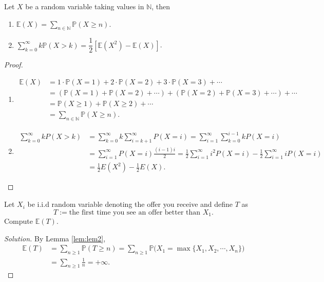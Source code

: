 \documentclass[11pt,singlecolumn, openany, citestyle=authoryear]{elegantbook}
\begin{document}
\begin{CJK}{UTF8}{gbsn}
\begin{lemma}\label{lem:lem2}
    Let $X$ be a random variable taking values in $\mathbb{N}$, then 
    \begin{enumerate}
    \item $\mathbb{E}(X)=\displaystyle \sum_{n\in\mathbb{N}}\mathbb{P}(X\geqslant n).$
    \item $\displaystyle \sum_{k=0}^\infty k\mathbb{P}(X>k)=\dfrac{1}{2}
    [\mathbb{E}(X^2)-\mathbb{E}(X)]$.
    \end{enumerate}
\end{lemma}
\begin{proof}
    \begin{enumerate}
    \item \begin{align*}
    \mathbb{E}(X) &= 1\cdot \mathbb{P}(X=1)+2\cdot \mathbb{P}(X=2)+
    3\cdot \mathbb{P}(X=3)+\cdots \\
    &= (\mathbb{P}(X=1)+\mathbb{P}(X=2)+\cdots)+(\mathbb{P}(X=2)+\mathbb{P}(X=3)+\cdots)
    +\cdots \\
    &= \mathbb{P}(X\geqslant 1)+\mathbb{P}(X\geqslant 2)+\cdots \\
    &= \sum_{n\in\mathbb{N}}\mathbb{P}(X\geqslant n).
    \end{align*}
    \item 
    \begin{align*}
    \sum_{k=0}^{\infty} k P(X>k) & =\sum_{k=0}^{\infty} k \sum_{i=k+1}^{\infty} P(X=i)=\sum_{i=1}^{\infty} \sum_{k=0}^{i-1} k P(X=i) \\
    & =\sum_{i=1}^{\infty} P(X=i) \frac{(i-1) i}{2}=\frac{1}{2} \sum_{i=1}^{\infty} i^2 P(X=i)-\frac{1}{2} \sum_{i=1}^{\infty} i P(X=i) \\
    & =\frac{1}{2} E\left(X^2\right)-\frac{1}{2} E(X) .
    \end{align*}
    \end{enumerate}
\end{proof}


\begin{example}
    Let $X_i$ be i.i.d random variable denoting the offer you receive and define $T$ as 
    $$T:= \text{the first time you see an offer better than }X_1.$$
    Compute $\mathbb{E}(T)$.
\end{example}
\begin{proof}[Solution]
    By Lemma \ref{lem:lem2}, 
    \begin{align*}
        \mathbb{E}(T) &= \sum_{n\geqslant 1}\mathbb{P}(T\geqslant n)=
        \sum_{n\geqslant 1}\mathbb{P}\mathbb(X_1=\max\{X_1,X_2,\cdots,X_n\})\\
        &= \sum_{n\geqslant 1}\frac{1}{n}= +\infty.
    \end{align*}
\end{proof}


\end{CJK}
\end{document}
